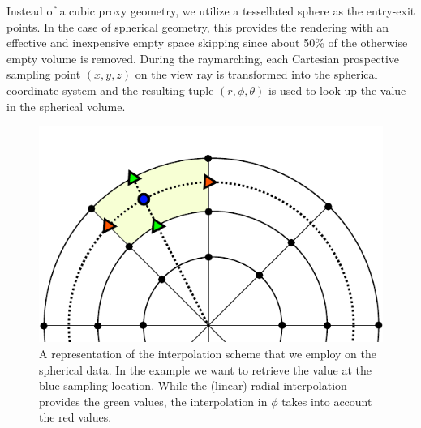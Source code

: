 \documentclass[journal]{vgtc}                %
\begin{document}
Instead of a cubic proxy geometry, we utilize a tessellated sphere as the entry-exit points. In the case of spherical geometry, this provides the rendering with an effective  and inexpensive empty space skipping since about 50\% of the otherwise empty volume is removed. During the raymarching, each Cartesian prospective sampling point $(x,y,z)$ on the view ray is transformed into the spherical coordinate system and the resulting tuple $(r, \phi, \theta)$ is used to look up the value in the spherical volume.

\begin{figure}[b!]
\newcommand{\abImageWidth}{0.65\columnwidth}
\centering
\includegraphics[width=\abImageWidth]{figures/spherical_interpolation.pdf}
\caption{A representation of the interpolation scheme that we employ on the spherical data. In the example we want to retrieve the value at the blue sampling location. While the (linear) radial interpolation provides the green values, the interpolation in $\phi$ takes into account the red values.}
\label{fig:sphericalvolume}
\end{figure}
\end{document}
